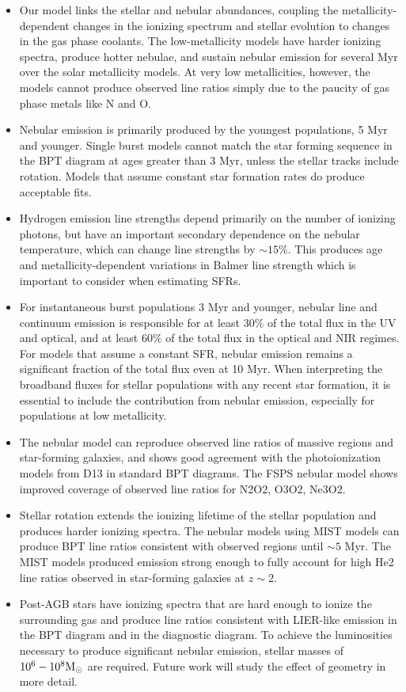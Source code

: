 \begin{itemize}
\item Our model links the stellar and nebular abundances, coupling the metallicity-dependent changes in the ionizing spectrum and stellar evolution to changes in the gas phase coolants. The low-metallicity models have harder ionizing spectra, produce hotter nebulae, and sustain nebular emission for several Myr over the solar metallicity models. At very low metallicities, however, the models cannot produce observed line ratios simply due to the paucity of gas phase metals like N and O.
\item Nebular emission is primarily produced by the youngest populations, 5 Myr and younger. Single burst models cannot match the star forming sequence in the BPT diagram at ages greater than 3 Myr, unless the stellar tracks include rotation. Models that assume constant star formation rates do produce acceptable fits.
\item Hydrogen emission line strengths depend primarily on the number of ionizing photons, but have an important secondary dependence on the nebular temperature, which can change \ha{} line strengths by $\sim15\%$. This produces age and metallicity-dependent variations in Balmer line strength which is important to consider when estimating SFRs.
\item For instantaneous burst populations 3 Myr and younger, nebular line and continuum emission is responsible for at least $30\%$ of the total flux in the UV and optical, and at least $60\%$ of the total flux in the optical and NIR regimes. For models that assume a constant SFR, nebular emission remains a significant fraction of the total flux even at 10 Myr. When interpreting the broadband fluxes for stellar populations with any recent star formation, it is essential to include the contribution from nebular emission, especially for populations at low metallicity.
\item The \FSPS nebular model can reproduce observed line ratios of massive \hii regions and star-forming galaxies, and shows good agreement with the photoionization models from D13 in standard BPT diagrams. The FSPS nebular model shows improved coverage of observed line ratios for N2O2, O3O2, Ne3O2.
\item Stellar rotation extends the ionizing lifetime of the stellar population and produces harder ionizing spectra. The \FSPS nebular models using MIST models can produce BPT line ratios consistent with observed \hii regions until ${\sim}5$ Myr. The MIST models produced \heii emission strong enough to fully account for high He2 line ratios observed in star-forming galaxies at $z{\sim}2$.
\item Post-AGB stars have ionizing spectra that are hard enough to ionize the surrounding gas and produce line ratios consistent with LIER-like emission in the BPT diagram and in the \sii{} diagnostic diagram. To achieve the luminosities necessary to produce significant nebular emission, stellar masses of $10^6-10^8\mathrm{M_{\odot}}$ are required. Future work will study the effect of geometry in more detail.
\end{itemize}

